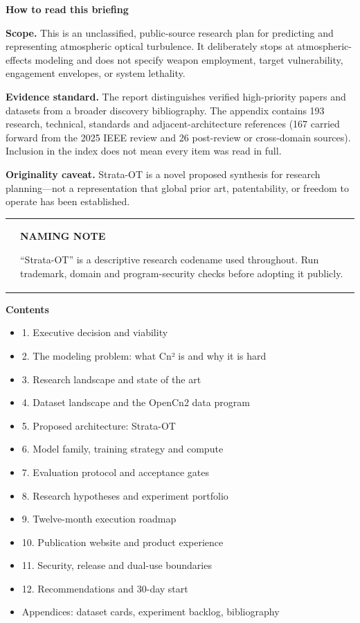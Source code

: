 \documentclass[
]{article}
\begin{document}
\textbf{How to read this briefing}

\textbf{Scope.} This is an unclassified, public-source research plan for
predicting and representing atmospheric optical turbulence. It
deliberately stops at atmospheric-effects modeling and does not specify
weapon employment, target vulnerability, engagement envelopes, or system
lethality.

\textbf{Evidence standard.} The report distinguishes verified
high-priority papers and datasets from a broader discovery bibliography.
The appendix contains 193 research, technical, standards and
adjacent-architecture references (167 carried forward from the 2025 IEEE
review and 26 post-review or cross-domain sources). Inclusion in the
index does not mean every item was read in full.

\textbf{Originality caveat.} Strata-OT is a novel proposed synthesis for
research planning---not a representation that global prior art,
patentability, or freedom to operate has been established.

\begin{longtable}[]{@{}
  >{\raggedright\arraybackslash}p{}
  >{\raggedright\arraybackslash}p{}@{}}
\toprule\noalign{}
\endhead
\bottomrule\noalign{}
\endlastfoot
& \textbf{NAMING NOTE}

``Strata-OT'' is a descriptive research codename used throughout. Run
trademark, domain and program-security checks before adopting it
publicly. \\
\end{longtable}

\textbf{Contents}

\begin{itemize}
\item
  1. Executive decision and viability
\item
  2. The modeling problem: what Cn² is and why it is hard
\item
  3. Research landscape and state of the art
\item
  4. Dataset landscape and the OpenCn2 data program
\item
  5. Proposed architecture: Strata-OT
\item
  6. Model family, training strategy and compute
\item
  7. Evaluation protocol and acceptance gates
\item
  8. Research hypotheses and experiment portfolio
\item
  9. Twelve-month execution roadmap
\item
  10. Publication website and product experience
\item
  11. Security, release and dual-use boundaries
\item
  12. Recommendations and 30-day start
\item
  Appendices: dataset cards, experiment backlog, bibliography
\end{itemize}
\end{document}
